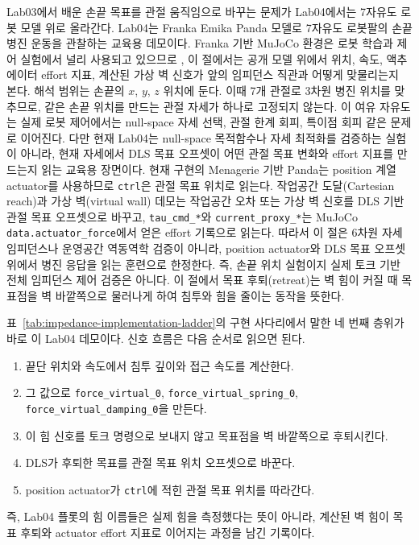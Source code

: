 Lab03에서 배운 손끝 목표를 관절 움직임으로 바꾸는 문제가 Lab04에서는 7자유도 로봇 모델 위로 올라간다.
Lab04는 Franka Emika Panda 모델로 7자유도 로봇팔의 손끝 병진 운동을 관찰하는 교육용 데모이다.
Franka 기반 MuJoCo 환경은 로봇 학습과 제어 실험에서 널리 사용되고 있으므로 \cite{xu2024frankamujocoenvs}, 이 절에서는 공개 모델 위에서 위치, 속도, 액추에이터 effort 지표, 계산된 가상 벽 신호가 앞의 임피던스 직관과 어떻게 맞물리는지 본다.
해석 범위는 손끝의 $x$, $y$, $z$ 위치에 둔다.
이때 7개 관절로 3차원 병진 위치를 맞추므로, 같은 손끝 위치를 만드는 관절 자세가 하나로 고정되지 않는다.
이 여유 자유도는 실제 로봇 제어에서는 null-space 자세 선택, 관절 한계 회피, 특이점 회피 같은 문제로 이어진다.
다만 현재 Lab04는 null-space 목적함수나 자세 최적화를 검증하는 실험이 아니라, 현재 자세에서 DLS 목표 오프셋이 어떤 관절 목표 변화와 effort 지표를 만드는지 읽는 교육용 장면이다.
현재 구현의 Menagerie 기반 Panda는 position 계열 actuator를 사용하므로 \texttt{ctrl}은 관절 목표 위치로 읽는다.
작업공간 도달(Cartesian reach)과 가상 벽(virtual wall) 데모는 작업공간 오차 또는 가상 벽 신호를 DLS 기반 관절 목표 오프셋으로 바꾸고, \texttt{tau\_cmd\_*}와 \texttt{current\_proxy\_*}는 MuJoCo \texttt{data.actuator\_force}에서 얻은 effort 기록으로 읽는다.
따라서 이 절은 6차원 자세 임피던스나 운영공간 역동역학 검증이 아니라, position actuator와 DLS 목표 오프셋 위에서 병진 응답을 읽는 훈련으로 한정한다.
즉, 손끝 위치 실험이지 실제 토크 기반 전체 임피던스 제어 검증은 아니다.
이 절에서 목표 후퇴(retreat)는 벽 힘이 커질 때 목표점을 벽 바깥쪽으로 물러나게 하여 침투와 힘을 줄이는 동작을 뜻한다.

표~\ref{tab:impedance-implementation-ladder}의 구현 사다리에서 말한 네 번째 층위가 바로 이 Lab04 데모이다.
신호 흐름은 다음 순서로 읽으면 된다.
\begin{enumerate}
  \item 끝단 위치와 속도에서 침투 깊이와 접근 속도를 계산한다.
  \item 그 값으로 \texttt{force\_virtual\_0}, \texttt{force\_virtual\_spring\_0}, \texttt{force\_virtual\_damping\_0}을 만든다.
  \item 이 힘 신호를 토크 명령으로 보내지 않고 목표점을 벽 바깥쪽으로 후퇴시킨다.
  \item DLS가 후퇴한 목표를 관절 목표 위치 오프셋으로 바꾼다.
  \item position actuator가 \texttt{ctrl}에 적힌 관절 목표 위치를 따라간다.
\end{enumerate}
즉, Lab04 플롯의 힘 이름들은 실제 힘을 측정했다는 뜻이 아니라, 계산된 벽 힘이 목표 후퇴와 actuator effort 지표로 이어지는 과정을 남긴 기록이다.

